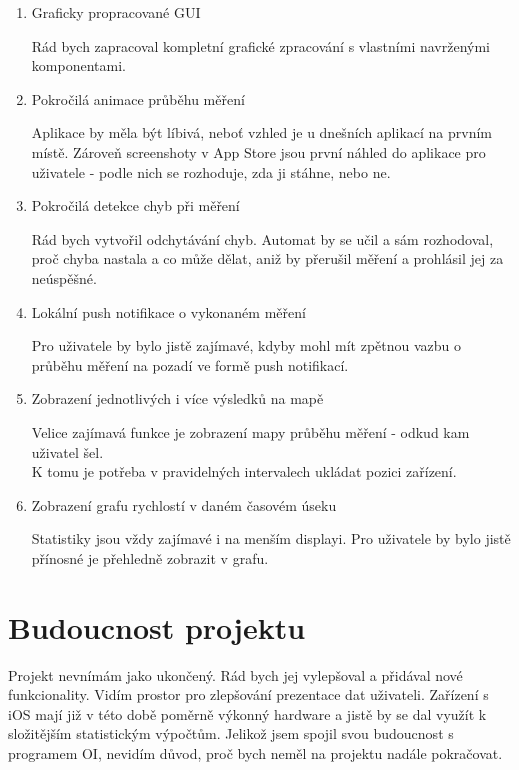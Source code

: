 \begin{enumerate}
\item Graficky propracované GUI

Rád bych zapracoval kompletní grafické zpracování s vlastními navrženými komponentami.
\item Pokročilá animace průběhu měření

Aplikace by měla být líbivá, neboť vzhled je u dnešních aplikací na prvním místě. Zároveň screenshoty v App Store jsou první náhled do aplikace pro uživatele - podle nich se rozhoduje, zda ji stáhne, nebo ne.
\item Pokročilá detekce chyb při měření

Rád bych vytvořil  odchytávání chyb. Automat by se učil a sám rozhodoval, proč chyba nastala a co může dělat, aniž by přerušil měření a prohlásil jej za neúspěšné.
\item Lokální push notifikace o vykonaném měření

Pro uživatele by bylo jistě zajímavé, kdyby mohl mít zpětnou vazbu o průběhu měření na pozadí ve formě push notifikací.
\item Zobrazení jednotlivých i více výsledků na mapě

Velice zajímavá funkce je zobrazení mapy průběhu měření - odkud kam uživatel šel. \\K tomu je potřeba v pravidelných intervalech ukládat pozici zařízení.
\item Zobrazení grafu rychlostí v daném časovém úseku

Statistiky jsou vždy zajímavé i na menším displayi. Pro uživatele by bylo jistě přínosné je  přehledně zobrazit v grafu.
\end{enumerate}

\section{Budoucnost projektu}
Projekt nevnímám jako ukončený. Rád bych jej vylepšoval a přidával nové funkcionality. Vidím prostor pro zlepšování prezentace dat uživateli. Zařízení s iOS mají již v této době poměrně výkonný hardware a jistě by se dal využít k složitějším statistickým výpočtům. Jelikož jsem spojil svou budoucnost s programem OI, nevidím důvod, proč bych neměl na projektu nadále pokračovat.